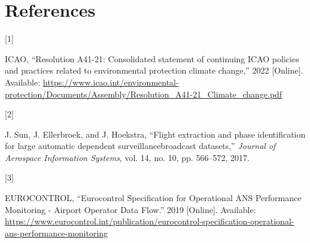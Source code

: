 \documentclass[letterpaper, 10 pt, journal, twoside]{IEEEtran}
\newlength{\cslhangindent}
\newlength{\csllabelwidth}
\newlength{\cslentryspacingunit} %
\newenvironment{CSLReferences}[2] %
 {%
  \setlength{\parindent}{0pt}
  \ifodd #1
  \let\oldpar\par
  \def\par{\hangindent=\cslhangindent\oldpar}
  \fi
  \setlength{\parskip}{#2\cslentryspacingunit}
 }%
 {}
\newcommand{\CSLLeftMargin}[1]{\parbox[t]{\csllabelwidth}{#1}}
\newcommand{\CSLRightInline}[1]{\parbox[t]{\linewidth - \csllabelwidth}{#1}\break}
\begin{document}
\hypertarget{bibliography}{%
\section*{References}\label{bibliography}}

\hypertarget{refs}{}
\begin{CSLReferences}{0}{0}
\leavevmode{}%
\CSLLeftMargin{{[}1{]} }%
\CSLRightInline{ICAO, {``Resolution A41-21: Consolidated statement of
continuing ICAO policies and practices related to environmental
protection {\textemdash} climate change,''} 2022 {[}Online{]}.
Available:
\url{https://www.icao.int/environmental-protection/Documents/Assembly/Resolution_A41-21_Climate_change.pdf}}

\leavevmode{}%
\CSLLeftMargin{{[}2{]} }%
\CSLRightInline{J. Sun, J. Ellerbroek, and J. Hoekstra, {``Flight
extraction and phase identification for large automatic dependent
surveillance\textendash broadcast datasets,''} \emph{Journal of
Aerospace Information Systems}, vol. 14, no. 10, pp. 566--572, 2017. }

\leavevmode{}%
\CSLLeftMargin{{[}3{]} }%
\CSLRightInline{EUROCONTROL, {``Eurocontrol {Specification} for
{Operational ANS Performance Monitoring} - {Airport Operator Data
Flow}.''} 2019 {[}Online{]}. Available:
\url{https://www.eurocontrol.int/publication/eurocontrol-specification-operational-ans-performance-monitoring}}

\end{CSLReferences}

\end{document}

